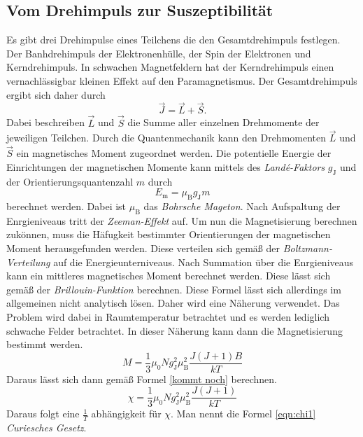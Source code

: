 \subsection{Vom Drehimpuls zur Suszeptibilität}
\label{subsec:drehsus}
Es gibt drei Drehimpulse eines Teilchens die den Gesamtdrehimpuls festlegen. Der Banhdrehimpuls der Elektronenhülle, der Spin der Elektronen und Kerndrehimpuls. In schwachen 
Magnetfeldern hat der Kerndrehimpuls einen vernachlässigbar kleinen Effekt auf den Paramagnetismus. Der Gesamtdrehimpuls ergibt sich daher durch 
\begin{equation*}
    \vec{J} = \vec{L} + \vec{S}.
\end{equation*}
Dabei beschreiben $\vec{L}$ und $\vec{S}$ die Summe aller einzelnen Drehmomente der jeweiligen Teilchen. Durch die Quantenmechanik kann den Drehmomenten $\vec{L}$ und $\vec{S}$
ein magnetisches Moment zugeordnet werden. 
Die potentielle Energie der Einrichtungen der magnetischen Momente kann mittels des \textit{Landé-Faktors} $g_{\text{J}}$ und der Orientierungsquantenzahl $m$ durch 
\begin{equation}
    E_{\text{m}} = \mu_{\text{B}} g_{\text{J}} m
\end{equation} 
berechnet werden. Dabei ist $\mu_{\text{B}}$ das \textit{Bohrsche Mageton}. Nach Aufspaltung der Enrgieniveaus tritt der \textit{Zeeman-Effekt} auf. Um nun die Magnetisierung
berechnen zukönnen, muss die Häfugkeit bestimmter Orientierungen der magnetischen Moment herausgefunden werden. Diese verteilen sich gemäß der \textit{Boltzmann-Verteilung}
auf die  Energieunterniveaus. Nach Summation über die Enrgieniveaus kann ein mittleres magnetisches Moment berechnet werden. Diese lässt sich gemäß der \textit{Brillouin-Funktion}
berechnen. Diese Formel lässt sich allerdings im allgemeinen nicht analytisch lösen. Daher wird eine Näherung verwendet. Das Problem wird dabei in Raumtemperatur betrachtet und
es werden lediglich schwache Felder betrachtet. In dieser Näherung kann dann die Magnetisierung bestimmt werden.
\begin{equation*}
    M = \frac{1}{3}\mu_0 N g^2_{\text{J}} \mu^2_{\text{B}} \frac{J(J+1)B}{kT}
\end{equation*}
Daraus lässt sich dann gemäß Formel \eqref{kommt noch} berechnen. 
\begin{equation}
    \label{eqn:chi1}
    \chi = \frac{1}{3}\mu_0 N g^2_{\text{J}} \mu^2_{\text{B}} \frac{J(J+1)}{kT}
\end{equation}   
Daraus folgt eine $\frac{1}{T}$ abhängigkeit für $\chi$. Man nennt die Formel \eqref{eqn:chi1} \textit{Curiesches Gesetz}.


